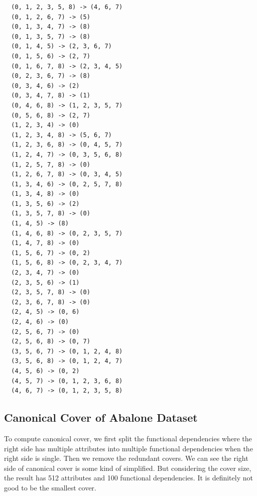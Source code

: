 \documentclass[11pt]{book}
\begin{document}
\begin{verbatim}
  (0, 1, 2, 3, 5, 8) -> (4, 6, 7)
  (0, 1, 2, 6, 7) -> (5)
  (0, 1, 3, 4, 7) -> (8)
  (0, 1, 3, 5, 7) -> (8)
  (0, 1, 4, 5) -> (2, 3, 6, 7)
  (0, 1, 5, 6) -> (2, 7)
  (0, 1, 6, 7, 8) -> (2, 3, 4, 5)
  (0, 2, 3, 6, 7) -> (8)
  (0, 3, 4, 6) -> (2)
  (0, 3, 4, 7, 8) -> (1)
  (0, 4, 6, 8) -> (1, 2, 3, 5, 7)
  (0, 5, 6, 8) -> (2, 7)
  (1, 2, 3, 4) -> (0)
  (1, 2, 3, 4, 8) -> (5, 6, 7)
  (1, 2, 3, 6, 8) -> (0, 4, 5, 7)
  (1, 2, 4, 7) -> (0, 3, 5, 6, 8)
  (1, 2, 5, 7, 8) -> (0)
  (1, 2, 6, 7, 8) -> (0, 3, 4, 5)
  (1, 3, 4, 6) -> (0, 2, 5, 7, 8)
  (1, 3, 4, 8) -> (0)
  (1, 3, 5, 6) -> (2)
  (1, 3, 5, 7, 8) -> (0)
  (1, 4, 5) -> (8)
  (1, 4, 6, 8) -> (0, 2, 3, 5, 7)
  (1, 4, 7, 8) -> (0)
  (1, 5, 6, 7) -> (0, 2)
  (1, 5, 6, 8) -> (0, 2, 3, 4, 7)
  (2, 3, 4, 7) -> (0)
  (2, 3, 5, 6) -> (1)
  (2, 3, 5, 7, 8) -> (0)
  (2, 3, 6, 7, 8) -> (0)
  (2, 4, 5) -> (0, 6)
  (2, 4, 6) -> (0)
  (2, 5, 6, 7) -> (0)
  (2, 5, 6, 8) -> (0, 7)
  (3, 5, 6, 7) -> (0, 1, 2, 4, 8)
  (3, 5, 6, 8) -> (0, 1, 2, 4, 7)
  (4, 5, 6) -> (0, 2)
  (4, 5, 7) -> (0, 1, 2, 3, 6, 8)
  (4, 6, 7) -> (0, 1, 2, 3, 5, 8)
\end{verbatim}

\subsection{Canonical Cover of Abalone Dataset}

To compute canonical cover, we first split the functional dependencies where the right side has multiple attributes into multiple functional dependencies when the right side is single.
Then we remove the redundant covers. We can see the right side of canonical cover is some kind of simplified. But considering the cover size, the result has 512 attributes and 100 functional dependencies. It is definitely not good to be the smallest cover.
\end{document}
